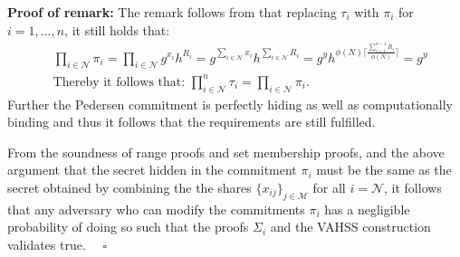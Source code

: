 \textbf{Proof of remark:}
The remark follows from that  replacing  $\tau_i$ with $\pi_i$ for $i=1,...,n$, it still holds that:
\begin{align*}
&\prod_{i\in\mathcal{N}} \pi_i = \prod_{i\in\mathcal{N}} g^{x_i}h^{R_i} = g^{\sum_{i\in\mathcal{N}} x_i}h^{\sum_{i\in\mathcal{N}} R_i} = g^{y} h^{ \phi(N)\big\lceil \frac{\sum_{i=1}^{n-1}R_i}{\phi(N) }\big\rceil} = g^y \\
&\text{Thereby it follows that: } \prod_{i\in\mathcal{N}}^n \tau_i = \prod_{i\in\mathcal{N}} \pi_i.
\end{align*}
Further the Pedersen commitment is perfectly hiding as well as computationally binding and thus it follows that the requirements are still fulfilled. 

From the soundness of range proofs and set membership proofs, and the above argument that the secret hidden in the commitment $\pi_i$ must be the same as the secret obtained by combining the the shares $\{x_{ij}\}_{j\in\mathcal{M}}$ for all $i=\mathcal{N}$, it follows that any adversary who can modify the commitments $\pi_i$ has a negligible probability of doing so such that the proofs $\Sigma_i$ and the VAHSS construction validates true. $\quad \square$

